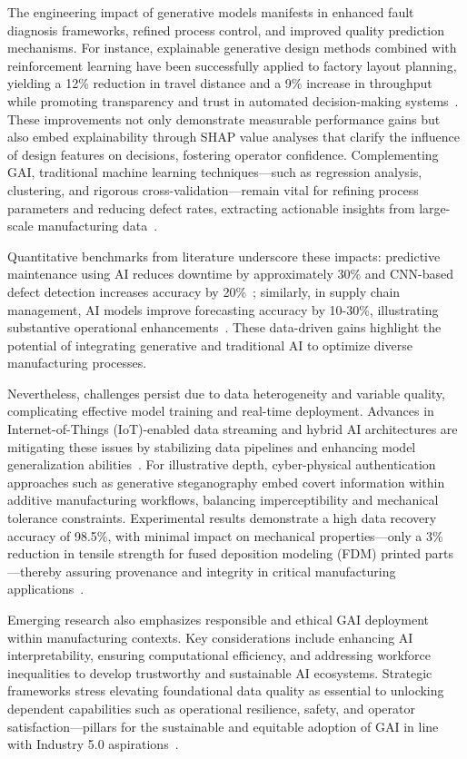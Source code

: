\documentclass[sigconf]{acmart}
\begin{document}
The engineering impact of generative models manifests in enhanced fault diagnosis frameworks, refined process control, and improved quality prediction mechanisms. For instance, explainable generative design methods combined with reinforcement learning have been successfully applied to factory layout planning, yielding a 12\% reduction in travel distance and a 9\% increase in throughput while promoting transparency and trust in automated decision-making systems~\cite{ref9}. These improvements not only demonstrate measurable performance gains but also embed explainability through SHAP value analyses that clarify the influence of design features on decisions, fostering operator confidence. Complementing GAI, traditional machine learning techniques—such as regression analysis, clustering, and rigorous cross-validation—remain vital for refining process parameters and reducing defect rates, extracting actionable insights from large-scale manufacturing data~\cite{ref10,ref13}.

Quantitative benchmarks from literature underscore these impacts: predictive maintenance using AI reduces downtime by approximately 30\% and CNN-based defect detection increases accuracy by 20\%~\cite{ref36}; similarly, in supply chain management, AI models improve forecasting accuracy by 10-30\%, illustrating substantive operational enhancements~\cite{ref29}. These data-driven gains highlight the potential of integrating generative and traditional AI to optimize diverse manufacturing processes.

Nevertheless, challenges persist due to data heterogeneity and variable quality, complicating effective model training and real-time deployment. Advances in Internet-of-Things (IoT)-enabled data streaming and hybrid AI architectures are mitigating these issues by stabilizing data pipelines and enhancing model generalization abilities~\cite{ref20,ref29}. For illustrative depth, cyber-physical authentication approaches such as generative steganography embed covert information within additive manufacturing workflows, balancing imperceptibility and mechanical tolerance constraints. Experimental results demonstrate a high data recovery accuracy of 98.5\%, with minimal impact on mechanical properties—only a 3\% reduction in tensile strength for fused deposition modeling (FDM) printed parts—thereby assuring provenance and integrity in critical manufacturing applications~\cite{ref10}.

Emerging research also emphasizes responsible and ethical GAI deployment within manufacturing contexts. Key considerations include enhancing AI interpretability, ensuring computational efficiency, and addressing workforce inequalities to develop trustworthy and sustainable AI ecosystems. Strategic frameworks stress elevating foundational data quality as essential to unlocking dependent capabilities such as operational resilience, safety, and operator satisfaction—pillars for the sustainable and equitable adoption of GAI in line with Industry 5.0 aspirations~\cite{ref1,ref43}.
\end{document}
